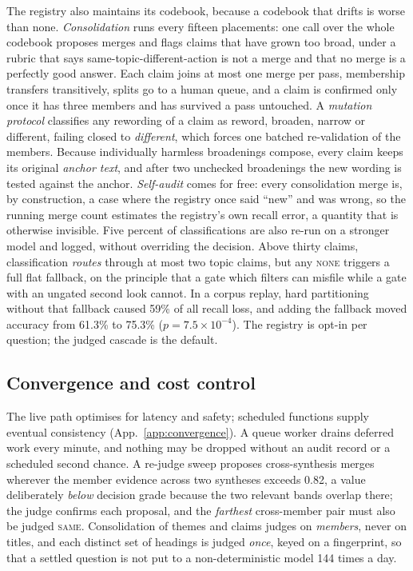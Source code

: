 \documentclass{article}
\begin{document}
The registry also maintains its codebook, because a codebook that drifts is worse than none. \emph{Consolidation} runs every fifteen placements: one call over the whole codebook proposes merges and flags claims that have grown too broad, under a rubric that says same-topic-different-action is not a merge and that no merge is a perfectly good answer. Each claim joins at most one merge per pass, membership transfers transitively, splits go to a human queue, and a claim is confirmed only once it has three members and has survived a pass untouched. A \emph{mutation protocol} classifies any rewording of a claim as reword, broaden, narrow or different, failing closed to \emph{different}, which forces one batched re-validation of the members. Because individually harmless broadenings compose, every claim keeps its original \emph{anchor text}, and after two unchecked broadenings the new wording is tested against the anchor. \emph{Self-audit} comes for free: every consolidation merge is, by construction, a case where the registry once said ``new'' and was wrong, so the running merge count estimates the registry's own recall error, a quantity that is otherwise invisible. Five percent of classifications are also re-run on a stronger model and logged, without overriding the decision. Above thirty claims, classification \emph{routes} through at most two topic claims, but any \textsc{none} triggers a full flat fallback, on the principle that a gate which filters can misfile while a gate with an ungated second look cannot. In a corpus replay, hard partitioning without that fallback caused 59\% of all recall loss, and adding the fallback moved accuracy from 61.3\% to 75.3\% ($p=7.5\times10^{-4}$). The registry is opt-in per question; the judged cascade is the default.

\subsection{Convergence and cost control}
\label{sec:convergence}
The live path optimises for latency and safety; scheduled functions supply eventual consistency (App.~\ref{app:convergence}). A queue worker drains deferred work every minute, and nothing may be dropped without an audit record or a scheduled second chance. A re-judge sweep proposes cross-synthesis merges wherever the member evidence across two syntheses exceeds 0.82, a value deliberately \emph{below} decision grade because the two relevant bands overlap there; the judge confirms each proposal, and the \emph{farthest} cross-member pair must also be judged \textsc{same}. Consolidation of themes and claims judges on \emph{members}, never on titles, and each distinct set of headings is judged \emph{once}, keyed on a fingerprint, so that a settled question is not put to a non-deterministic model 144 times a day.
\end{document}
